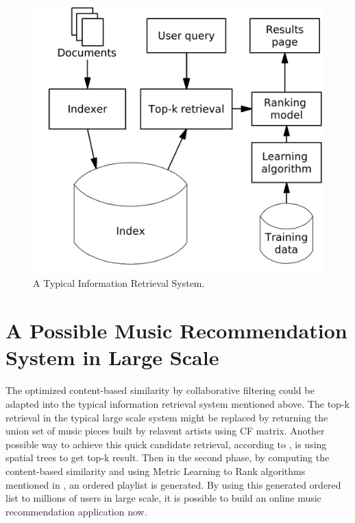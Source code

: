 \documentclass[jou]{apa6}
\begin{document}
\begin{figure}[h!]
  \includegraphics[width=\linewidth]{MLR-search-engine-example.png}
  \caption{A Typical Information Retrieval System.}
  \label{fig:Figure1}
\end{figure}

\section{A Possible Music Recommendation System in Large Scale}

The optimized content-based similarity by collaborative filtering could be adapted into the typical information retrieval system mentioned above. The top-k retrieval in the typical
large scale system might be replaced by returning the union set of music pieces built by 
relavent artists using CF matrix. Another possible way to achieve this quick candidate 
retrieval, according to \textcite{mcfee2011large}, is using spatial trees to get top-k 
result. Then in the second phase, by computing the content-based similarity and using Metric Learning to Rank algorithms mentioned in \textcite{mcfee2010metric}, an ordered playlist is generated. By using this generated ordered list to millions of users in large scale, it is possible to 
build an online music recommendation application now.

\printbibliography
\end{document}
